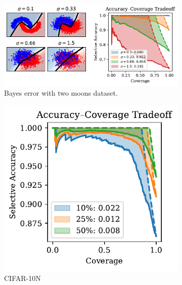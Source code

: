 \begin{figure}[t]
  \centering
  \begin{subfigure}[t]{0.49\textwidth}
  \centering
    \includegraphics[width=\linewidth]{figs/sc_bounds/2moons_bayes.pdf}%
    \caption{Bayes error with two moons dataset.}
    \label{fig:left}
  \end{subfigure}%
  \begin{subfigure}[t]{0.24\textwidth}
    \centering
    \includegraphics[width=\linewidth]{figs/sc_bounds/cifar10_noisy_tradeoff.pdf}
    \caption{CIFAR-10N}
    \label{fig:right}
  \end{subfigure}
  \begin{subfigure}[t]{0.24\textwidth}
    \centering

\end{subfigure}
\end{figure}
